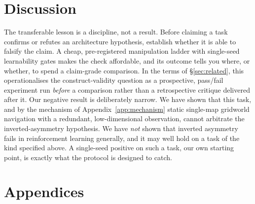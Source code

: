 \documentclass{article}
\begin{document}
\section{Discussion}
\label{sec:discussion}

The transferable lesson is a discipline, not a result. Before claiming a task confirms
or refutes an architecture hypothesis, establish whether it is able to falsify the claim. A
cheap, pre-registered manipulation ladder with single-seed learnability gates makes the check
affordable, and its outcome tells you where, or whether, to spend a claim-grade comparison. In
the terms of \S\ref{sec:related}, this operationalises the construct-validity question as a
prospective, pass/fail experiment run \emph{before} a comparison rather than a retrospective
critique delivered after it. Our negative result is deliberately narrow. We have shown that
this task, and by the mechanism of Appendix~\ref{app:mechanism} static single-map gridworld
navigation with a redundant, low-dimensional observation, cannot arbitrate the
inverted-asymmetry hypothesis. We have \emph{not} shown that inverted asymmetry fails in
reinforcement learning generally, and it may well hold on a task of the kind specified above.
A single-seed positive on such a task, our own starting point, is exactly what the protocol is
designed to catch.




\clearpage
\appendix
\section*{Appendices}

\end{document}
